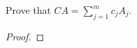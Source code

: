 \documentclass{amsart}
\begin{document}
\begin{thm*}[\S1.4, \#7] 
Prove that $CA = \sum_{j = 1}^m c_j A_j$. 
\end{thm*}



\begin{proof} 
\end{proof}







	
\end{document}
